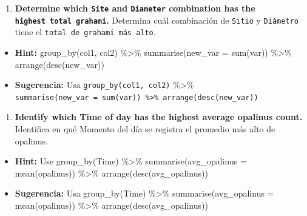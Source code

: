 \documentclass[
]{article}
\providecommand{\tightlist}{%
  \setlength{\itemsep}{0pt}\setlength{\parskip}{0pt}}
\begin{document}
\begin{enumerate}
\def\labelenumi{\arabic{enumi}.}
\setcounter{enumi}{4}
\tightlist
\item
  \textbf{Determine which \texttt{Site} and \texttt{Diameter}
  combination has the \texttt{highest\ total\ grahami}.} Determina cuál
  combinación de \texttt{Sitio} y \texttt{Diámetro} tiene el
  \texttt{total\ de\ grahami\ más\ alto}.
\end{enumerate}

\begin{itemize}
\tightlist
\item
  \textbf{Hint:} group\_by(col1, col2) \%\textgreater\%
  summarise(new\_var = sum(var)) \%\textgreater\%
  arrange(desc(new\_var))
\item
  \textbf{Sugerencia:} Usa \texttt{group\_by(col1,\ col2)}
  \%\textgreater\%
  \texttt{summarise(new\_var\ =\ sum(var))\ \%\textgreater{}\%\ arrange(desc(new\_var))}
\end{itemize}

\begin{enumerate}
\def\labelenumi{\arabic{enumi}.}
\setcounter{enumi}{5}
\tightlist
\item
  \textbf{Identify which Time of day has the highest average opalinus
  count.} Identifica en qué Momento del día se registra el promedio más
  alto de opalinus.
\end{enumerate}

\begin{itemize}
\tightlist
\item
  \textbf{Hint:} Use group\_by(Time) \%\textgreater\%
  summarise(avg\_opalinus = mean(opalinus)) \%\textgreater\%
  arrange(desc(avg\_opalinus))
\item
  \textbf{Sugerencia:} Usa group\_by(Time) \%\textgreater\%
  summarise(avg\_opalinus = mean(opalinus)) \%\textgreater\%
  arrange(desc(avg\_opalinus))
\end{itemize}
\end{document}
